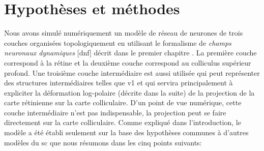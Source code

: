 
\section{Hypothèses et méthodes}

Nous avons simulé numériquement un modèle de réseau de neurones de trois couches organisées topologiquement en utilisant le formalisme de \textit{champs neuronaux dynamiques} [\gls{dnf}] décrit dans le premier chapitre \cite{Amari:1977}. La première couche correspond à la rétine et la deuxième couche correspond au colliculus supérieur profond. Une troisième couche intermédiaire est aussi utilisée qui peut représenter des structures intermédiaires telles que \gls{v1} et qui servira principalement à expliciter la déformation log-polaire (décrite dans la suite) de la projection de la carte rétinienne sur la carte colliculaire. D'un point de vue numérique, cette couche intermédiaire n'est pas indispensable, la projection peut se faire directement sur la carte colliculaire. Comme expliqué dans l'introduction, le modèle a été établi seulement sur la base des hypothèses communes à d'autres modèles du \gls{sc} que nous résumons dans les cinq points suivants:\\

